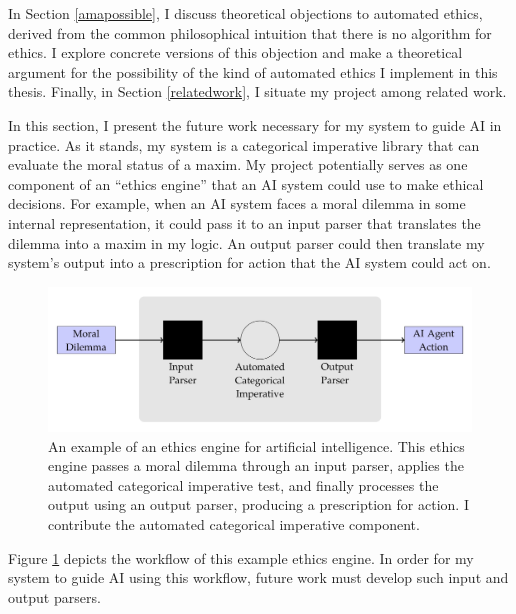 \begin{isabellebody}
\begin{isamarkuptext}
In Section \ref{amapossible}, I discuss theoretical objections to automated ethics, derived from the
common philosophical intuition that there is no algorithm for ethics. I explore concrete versions of 
this objection and make a theoretical argument for the possibility of the kind of automated ethics 
I implement in this thesis. Finally, in Section \ref{relatedwork}, I situate my project among related work.%
\end{isamarkuptext}\isamarkuptrue%
%
\isadelimdocument
%
\endisadelimdocument
%
\isatagdocument
%
\isamarkuptrue%
%
\endisatagdocument
{\isafolddocument}%
%
\isadelimdocument
%
\endisadelimdocument
%
\begin{isamarkuptext}%
In this section, I present the future work necessary for my system to guide AI 
in practice. As it stands, my system is a categorical imperative library that can
evaluate the moral status of a maxim. My project potentially 
serves as one component of an ``ethics engine'' that an AI system could use to make ethical decisions.
For example, when an AI system faces a moral dilemma in some internal representation, it could pass it 
to an input parser that translates the dilemma into a maxim in my logic. An output parser could then 
translate my system's output into a prescription for action that the AI system could act on. \begin{figure}
\includegraphics[scale=0.175]{AI_engine.jpeg}
\caption{An example of an ethics engine for artificial intelligence. This ethics engine passes a moral dilemma 
through an input parser, applies the automated categorical imperative test, and finally processes the 
output using an output parser, producing a prescription for action. I contribute the automated categorical 
imperative component.} \label{fig:AIengine}
\end{figure} Figure \ref{fig:AIengine} depicts the workflow of this example ethics engine. In order 
for my system to guide AI using this workflow, future work must develop such input and output parsers.


\end{isamarkuptext}
\end{isabellebody}
